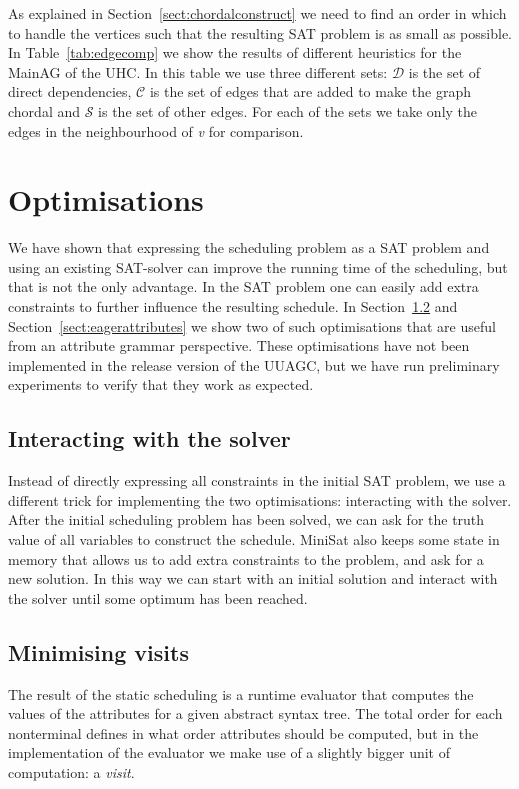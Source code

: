 \documentclass{llncs}
\newcommand{\tabref}[1]{Table~\ref{#1}}
\newcommand{\sectref}[1]{Section~\ref{#1}}
\begin{document}
As explained in \sectref{sect:chordalconstruct} we need to find an order in which to handle the vertices such that the resulting SAT problem is as small as possible. In \tabref{tab:edgecomp} we show the results of different heuristics for the MainAG of the UHC. In this table we use three different sets: $\mathcal{D}$ is the set of direct dependencies, $\mathcal{C}$ is the set of edges that are added to make the graph chordal and $\mathcal{S}$ is the set of other edges. For each of the sets we take only the edges in the neighbourhood of \emph{v} for comparison.

\section{Optimisations} \label{sect:optimisations}
We have shown that expressing the scheduling problem as a SAT problem and using an existing SAT-solver can improve the running time of the scheduling, but that is not the only advantage. In the SAT problem one can easily add extra constraints to further influence the resulting schedule. In \sectref{sect:minimising} and \sectref{sect:eagerattributes} we show two of such optimisations that are useful from an attribute grammar perspective. These optimisations have not been implemented in the release version of the UUAGC, but we have run preliminary experiments to verify that they work as expected.

\subsection{Interacting with the solver}
Instead of directly expressing all constraints in the initial SAT problem, we use a different trick for implementing the two optimisations: interacting with the solver. After the initial scheduling problem has been solved, we can ask for the truth value of all variables to construct the schedule. MiniSat also keeps some state in memory that allows us to add extra constraints to the problem, and ask for a new solution. In this way we can start with an initial solution and interact with the solver until some optimum has been reached.

\subsection{Minimising visits} \label{sect:minimising}
The result of the static scheduling is a runtime evaluator that computes the values of the attributes for a given abstract syntax tree. The total order for each nonterminal defines in what order attributes should be computed, but in the implementation of the evaluator we make use of a slightly bigger unit of computation: a \emph{visit}.
\end{document}
